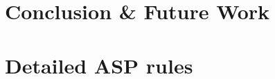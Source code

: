 \documentclass[12pt]{report}
\begin{document}
\chapter{Conclusion \& Future Work}
\label{sec:conclusion}


\newpage




\newpage

\appendix
{}
\chapter{Detailed ASP rules}
\label{sec:appendix-netlogo}



\end{document}
